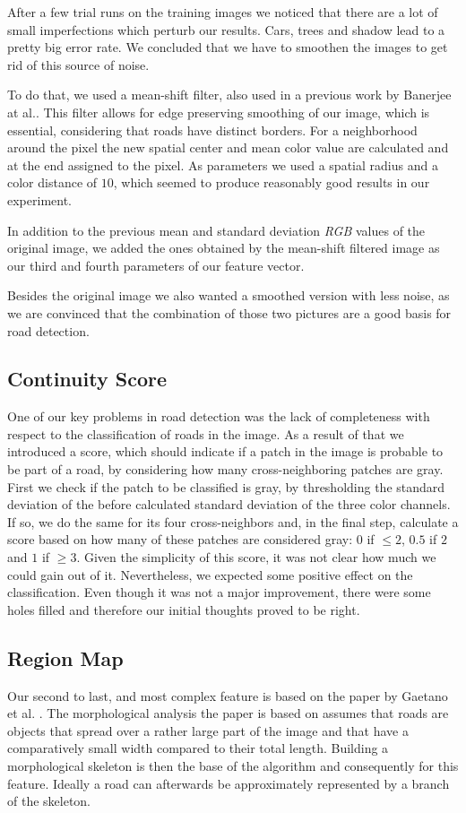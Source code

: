 \documentclass[10pt,conference,compsocconf]{IEEEtran}
\begin{document}
After a few trial runs on the training images we noticed that there are a lot of small imperfections which perturb our results. Cars, trees and shadow lead to a pretty big error rate. We concluded that we have to smoothen the images to get rid of this source of noise.

To do that, we used a mean-shift filter, also used in a previous work by Banerjee at al.\cite{BaBuMo12}. This filter allows for edge preserving smoothing of our image, which is essential, considering that roads have distinct borders. For a neighborhood around the pixel the new spatial center and mean color value are calculated and at the end assigned to the pixel. As parameters we used a spatial radius and a color distance of $10$, which seemed to produce reasonably good results in our experiment.

In addition to the previous mean and standard deviation \emph{RGB} values of the original image, we added the ones obtained by the mean-shift filtered image as our third and fourth parameters of our feature vector. 

Besides the original image we also wanted a smoothed version with less noise, as we are convinced that the combination of those two pictures are a good basis for road detection.

\subsection{Continuity Score}
\label{sec:continuity_score}
One of our key problems in road detection was the lack of completeness with respect to the classification of roads in the image. As a result of that we introduced a score, which should indicate if a patch in the image is probable to be part of a road, by considering how many cross-neighboring patches are gray. First we check if the patch to be classified is gray, by thresholding the standard deviation of the before calculated standard deviation of the three color channels. If so, we do the same for its four cross-neighbors and, in the final step, calculate a score based on how many of these patches are considered gray: $0$ if $\leq2$, $0.5$ if $2$ and $1$ if $\geq3$.
Given the simplicity of this score, it was not clear how much we could gain out of it. Nevertheless, we expected some positive effect on the classification. Even though it was not a major improvement, there were some holes filled and therefore our initial thoughts proved to be right.

\subsection{Region Map}
Our second to last, and most complex feature is based on the paper by Gaetano et al. \cite{GaZeScPo11}. The morphological analysis the paper is based on assumes that roads are objects that spread over a rather large part of the image and that have a comparatively small width compared to their total length. Building a morphological skeleton is then the base of the algorithm and consequently for this feature. Ideally a road can afterwards be approximately represented by a branch of the skeleton.
\end{document}
